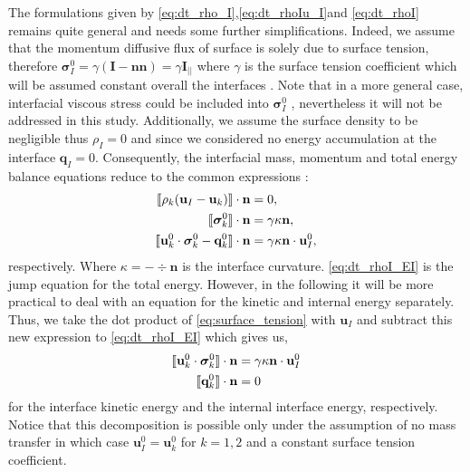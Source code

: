 The formulations given by \ref{eq:dt_rho_I},\ref{eq:dt_rhoIu_I}and \ref{eq:dt_rhoI} remains quite general and needs some further simplifications. 
Indeed, we assume that the momentum diffusive flux of surface is solely due to surface tension, therefore $\bm{\sigma}_I^0  = \gamma (\textbf{I} - \textbf{nn}) = \gamma \textbf{I}_{||}$ where $\gamma$ is the surface tension coefficient which will be assumed constant overall the interfaces \citep[Chapter 2]{tryggvason2011direct}.  
Note that in a more general case, interfacial viscous stress could be included into $\bm{\sigma}_{I}^0$ \citep{brenner2013interfacial,slattery2007interfacial,nadim1996concise}, nevertheless it will not be addressed in this study. 
Additionally, we assume the surface density to be negligible thus $\rho_I = 0$ and since we considered no energy accumulation at the interface $\textbf{q}_I=0$. 
Consequently, the interfacial mass, momentum and total energy balance equations reduce to the common expressions :
\begin{align}
    \label{eq:dt_rho_I}
    \llbracket 
        \rho_k (\textbf{u}_I - \textbf{u}_k)
     \rrbracket \cdot \textbf{n}
    &=0, \\
    \llbracket \bm{\sigma}_k^0 \rrbracket \cdot \textbf{n} 
    &=
    \gamma\kappa\textbf{n},
    \label{eq:surface_tension}\\
    \label{eq:dt_rhoI_EI}
    \llbracket \textbf{u}_k^0 \cdot \bm{\sigma}_k^0 - \textbf{q}_k^0 \rrbracket \cdot \textbf{n}
    &= 
     \gamma\kappa\textbf{n}\cdot \textbf{u}_{I}^0,
\end{align}
respectively. 
Where $\kappa = - \div\textbf{n}$ is the interface curvature.
\ref{eq:dt_rhoI_EI} is the jump equation for the total energy.
However, in the following it will be more practical to deal with an equation for the kinetic and internal energy separately. 
Thus, we take the dot product of \ref{eq:surface_tension} with $\textbf{u}_I$ and subtract this new expression to \ref{eq:dt_rhoI_EI} which gives us, 
\begin{align}
    \label{eq:dt_rhoI_uI2}
    \llbracket \textbf{u}_k^0 \cdot \bm{\sigma}_k^0 \rrbracket \cdot \textbf{n}
    &= 
     \gamma\kappa\textbf{n}\cdot \textbf{u}_{I}^0\\
    \label{eq:dt_rhoIe_I}
    \llbracket  \textbf{q}_k^0 \rrbracket \cdot \textbf{n}
    &= 
     0
\end{align}
for the interface kinetic energy and the internal interface energy, respectively. 
Notice that this decomposition is possible only under the assumption of no mass transfer in which case $\textbf{u}_I^0=\textbf{u}_k^0$ for $k =1,2$ and a constant surface tension coefficient.


